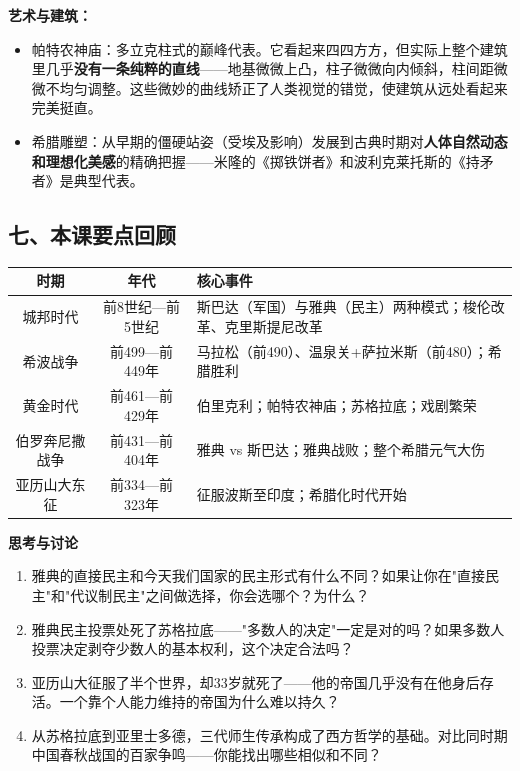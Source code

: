 \documentclass[a4paper,12pt]{ctexart}
\begin{document}
\textbf{艺术与建筑：}
\begin{itemize}
  \item 帕特农神庙：多立克柱式的巅峰代表。它看起来四四方方，但实际上整个建筑里几乎\textbf{没有一条纯粹的直线}——地基微微上凸，柱子微微向内倾斜，柱间距微微不均匀调整。这些微妙的曲线矫正了人类视觉的错觉，使建筑从远处看起来完美挺直。
  \item 希腊雕塑：从早期的僵硬站姿（受埃及影响）发展到古典时期对\textbf{人体自然动态和理想化美感}的精确把握——米隆的《掷铁饼者》和波利克莱托斯的《持矛者》是典型代表。
\end{itemize}

\subsection*{七、本课要点回顾}

\begin{center}
\begin{tabular}{|c|c|p{7cm}|}
\hline
\textbf{时期} & \textbf{年代} & \textbf{核心事件} \\
\hline
城邦时代 & 前8世纪—前5世纪 & 斯巴达（军国）与雅典（民主）两种模式；梭伦改革、克里斯提尼改革 \\
\hline
希波战争 & 前499—前449年 & 马拉松（前490）、温泉关+萨拉米斯（前480）；希腊胜利 \\
\hline
黄金时代 & 前461—前429年 & 伯里克利；帕特农神庙；苏格拉底；戏剧繁荣 \\
\hline
伯罗奔尼撒战争 & 前431—前404年 & 雅典 vs 斯巴达；雅典战败；整个希腊元气大伤 \\
\hline
亚历山大东征 & 前334—前323年 & 征服波斯至印度；希腊化时代开始 \\
\hline
\end{tabular}
\end{center}

\vspace{0.3cm}
{\large\textcolor{orange!80!black}{\textbf{思考与讨论}}}
\begin{enumerate}
  \item 雅典的直接民主和今天我们国家的民主形式有什么不同？如果让你在"直接民主"和"代议制民主"之间做选择，你会选哪个？为什么？
  \item 雅典民主投票处死了苏格拉底——"多数人的决定"一定是对的吗？如果多数人投票决定剥夺少数人的基本权利，这个决定合法吗？
  \item 亚历山大征服了半个世界，却33岁就死了——他的帝国几乎没有在他身后存活。一个靠个人能力维持的帝国为什么难以持久？
  \item 从苏格拉底到亚里士多德，三代师生传承构成了西方哲学的基础。对比同时期中国春秋战国的百家争鸣——你能找出哪些相似和不同？
\end{enumerate}
\end{document}
